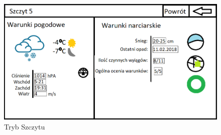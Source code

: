 \documentclass[10pt, a4paper]{article}
\begin{document}
	\begin{figure}[h]
	\centering
	\includegraphics[width=\linewidth]{szczytu.png}
	\caption{Tryb Szczytu}
	\end{figure}
\newpage
{}


\end{document}
